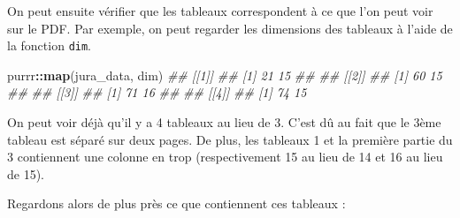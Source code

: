 \documentclass[
  french,
]{book}
\newenvironment{Shaded}{\begin{snugshade}}{\end{snugshade}}
\newcommand{\CommentTok}[1]{\textcolor[rgb]{0.56,0.35,0.01}{\textit{#1}}}
\newcommand{\KeywordTok}[1]{\textcolor[rgb]{0.13,0.29,0.53}{\textbf{#1}}}
\newcommand{\NormalTok}[1]{#1}
\newcommand{\OperatorTok}[1]{\textcolor[rgb]{0.81,0.36,0.00}{\textbf{#1}}}
\begin{document}
On peut ensuite vérifier que les tableaux correspondent à ce que l'on peut voir sur le PDF. Par exemple, on peut regarder les dimensions des tableaux à l'aide de la fonction \texttt{dim}.

\begin{Shaded}
\begin{Highlighting}[]
\NormalTok{purrr}\OperatorTok{::}\KeywordTok{map}\NormalTok{(jura\_data, dim)}
\CommentTok{\#\# [[1]]}
\CommentTok{\#\# [1] 21 15}
\CommentTok{\#\# }
\CommentTok{\#\# [[2]]}
\CommentTok{\#\# [1] 60 15}
\CommentTok{\#\# }
\CommentTok{\#\# [[3]]}
\CommentTok{\#\# [1] 71 16}
\CommentTok{\#\# }
\CommentTok{\#\# [[4]]}
\CommentTok{\#\# [1] 74 15}
\end{Highlighting}
\end{Shaded}

On peut voir déjà qu'il y a 4 tableaux au lieu de 3. C'est dû au fait que le 3ème tableau est séparé sur deux pages. De plus, les tableaux 1 et la première partie du 3 contiennent une colonne en trop (respectivement 15 au lieu de 14 et 16 au lieu de 15).

Regardons alors de plus près ce que contiennent ces tableaux :
\end{document}

